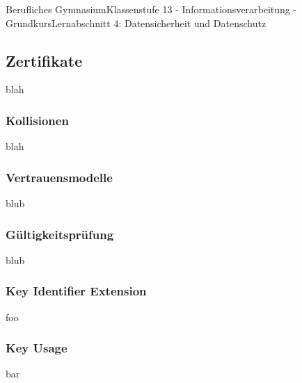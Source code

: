 \documentclass[11pt,oneside,openany,headings=optiontotoc,11pt,numbers=noenddot]{article}
\begin{document}
	\begin{worksheet}{Berufliches Gymnasium}{Klassenstufe 13 - Informationsverarbeitung - Grundkurs}{Lernabschnitt 4: Datensicherheit und Datenschutz}
		\setlength{\columnseprule}{0pt}
		\setcounter{section}{3}
		\setcounter{subsection}{2}
		\setcounter{page}{27}
		\subsection{Zertifikate}
		blah
		\subsubsection{Kollisionen}
		blah
		\subsubsection{Vertrauensmodelle}
		blub
		\subsubsection{Gültigkeitsprüfung}
		blub
		\subsubsection{Key Identifier Extension}
		foo
		\subsubsection{Key Usage}
		bar
	\end{worksheet}
\end{document}
